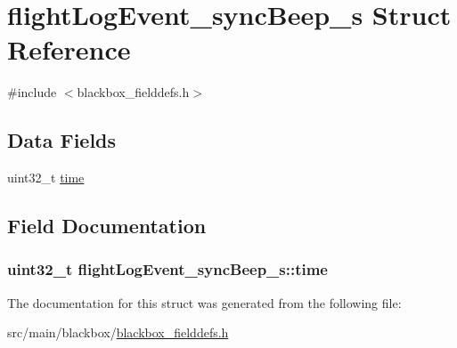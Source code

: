 \hypertarget{structflightLogEvent__syncBeep__s}{\section{flight\+Log\+Event\+\_\+sync\+Beep\+\_\+s Struct Reference}
\label{structflightLogEvent__syncBeep__s}
}


{\ttfamily \#include $<$blackbox\+\_\+fielddefs.\+h$>$}

\subsection*{Data Fields}
\begin{DoxyCompactItemize}
\item 
uint32\+\_\+t \hyperlink{structflightLogEvent__syncBeep__s_acabf0e6a1616df959236ba3c698eebb4}{time}
\end{DoxyCompactItemize}


\subsection{Field Documentation}
\hypertarget{structflightLogEvent__syncBeep__s_acabf0e6a1616df959236ba3c698eebb4}{
\subsubsection[{time}]{\setlength{\rightskip}{0pt plus 5cm}uint32\+\_\+t flight\+Log\+Event\+\_\+sync\+Beep\+\_\+s\+::time}}\label{structflightLogEvent__syncBeep__s_acabf0e6a1616df959236ba3c698eebb4}


The documentation for this struct was generated from the following file\+:\begin{DoxyCompactItemize}
\item 
src/main/blackbox/\hyperlink{blackbox__fielddefs_8h}{blackbox\+\_\+fielddefs.\+h}\end{DoxyCompactItemize}
